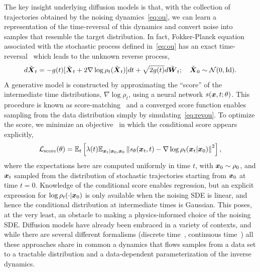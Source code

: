 \documentclass[11pt]{article}
\begin{document}
The key insight underlying diffusion models is that, with the collection of trajectories obtained by the noising dynamics~\eqref{eq:ou}, we can learn a representation of the time-reversal of this dynamics and convert noise into samples that resemble the target distribution.
In fact, Fokker-Planck equation associated with the stochastic process defined in~\eqref{eq:ou} has an exact time-reversal~\cite{anderson_reverse-time_1982,song_score-based_2022} which leads to the unknown reverse process,
\begin{equation}
    d\tilde{\boldsymbol{X}}_t = -g(t)[\tilde{\boldsymbol{X}}_t + 2 \nabla \log \rho_t(\tilde{\boldsymbol{X}}_t)] dt + \sqrt{2 g(t)} d\tilde{\boldsymbol{W}}_t; \quad \tilde{\boldsymbol{X}}_0\sim \mathcal{N}(0,\rm{Id}).
    \label{eq:revou}
\end{equation}
A generative model is constructed by approximating the ``score'' of the intermediate time distributions, $\nabla \log \rho_t$, using a neural network $s(\boldsymbol{x}, t; \theta)$.
This procedure is known as score-matching~\cite{song_score-based_2022} and a converged score function enables sampling from the data distribution simply by simulating~\eqref{eq:revou}.
To optimize the score, we minimize an objective~\cite{song_score-based_2022} in which the conditional score appears explicitly,
\begin{equation}
    \mathcal{L}_{\rm score}(\theta) = \mathbb{E}_t \left[ \lambda(t) \mathbb{E}_{\boldsymbol{x}_t| \boldsymbol{x}_0, \boldsymbol{x}_0} \left\| s_{\theta}(\boldsymbol{x}_t, t) - \nabla \log \rho_t (\boldsymbol{x}_t | \boldsymbol{x}_0) \right\|^2 \right],
\end{equation}
where the expectations here are computed uniformly in time $t$, with $\boldsymbol{x}_0 \sim \rho_0$, and $\boldsymbol{x}_t$ sampled from the distribution of stochastic trajectories starting from $\boldsymbol{x}_0$ at time $t=0.$
Knowledge of the conditional score enables regression, but an explicit expression for $\log \rho_t (\cdot | \boldsymbol{x}_0)$ is only available when the noising SDE is linear, and hence the conditional distribution at intermediate times is Gaussian.
This poses, at the very least, an obstacle to making a physics-informed choice of the noising SDE. 
Diffusion models have already been embraced in a variety of contexts, and while there are several different formalisms (discrete time~\cite{ho_denoising_2020}, continuous time~\cite{song_score-based_2022,vroylandt_likelihood-based_2022}) all these approaches share in common a dynamics that flows samples from a data set to a tractable distribution and a data-dependent parameterization of the inverse dynamics.
\end{document}
